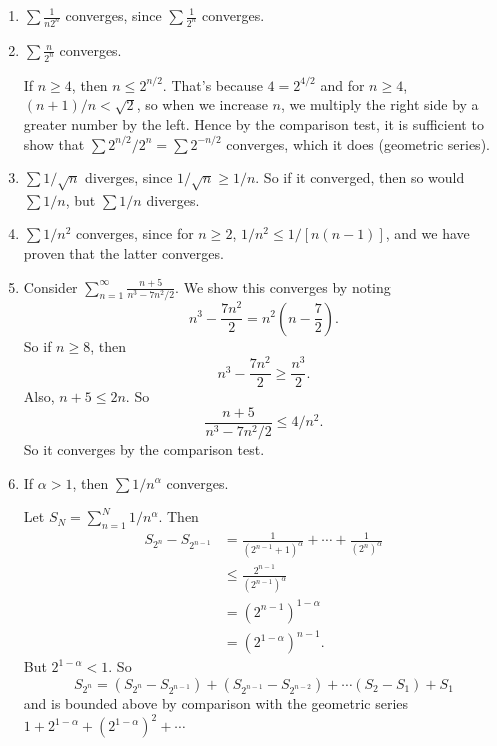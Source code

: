 \documentclass[a4paper]{article}
\begin{document}
\begin{eg}\leavevmode
  \begin{enumerate}
    \item $\sum \frac{1}{n2^n}$ converges, since $\sum \frac{1}{2^n}$ converges.
    \item $\sum \frac{n}{2^n}$ converges.

      If $n \geq 4$, then $n \leq 2^{n/2}$. That's because $4 = 2^{4/2}$ and for $n\geq 4$, $(n + 1)/n < \sqrt{2}$, so when we increase $n$, we multiply the right side by a greater number by the left. Hence by the comparison test, it is sufficient to show that $\sum 2^{n/2}/2^n = \sum 2^{-n/2}$ converges, which it does (geometric series).
    \item $\sum 1/\sqrt{n}$ diverges, since $1/\sqrt{n} \geq 1/n$. So if it converged, then so would $\sum 1/n$, but $\sum 1/n$ diverges.
    \item $\sum 1/n^2$ converges, since for $n \geq 2$, $1/n^2 \leq 1/[n(n - 1)]$, and we have proven that the latter converges.
    \item Consider $\displaystyle \sum_{n = 1}^\infty \frac{n + 5}{n^3 - 7n^2/2}$. We show this converges by noting
      \[
        n^3 - \frac{7n^2}{2} = n^2\left(n - \frac{7}{2}\right).
      \]
      So if $n \geq 8$, then
      \[
        n^3 - \frac{7n^2}{2} \geq \frac{n^3}{2}.
      \]
      Also, $n + 5 \leq 2n$. So
      \[
        \frac{n + 5}{n^3 - 7n^2/2} \leq 4/n^2.
      \]
      So it converges by the comparison test.
    \item If $\alpha > 1$, then $\sum 1/n^\alpha$ converges.

      Let $S_N = \sum_{n = 1}^N 1/n^\alpha$. Then
      \begin{align*}
        S_{2^n} - S_{2^{n - 1}} &= \frac{1}{(2^{n - 1} + 1)^\alpha} + \cdots + \frac{1}{(2^{n})^\alpha}\\
        &\leq \frac{2^{n - 1}}{(2^{n - 1})^\alpha}\\
        &= (2^{n - 1})^{1 - \alpha}\\
        &= (2^{1 - \alpha})^{n - 1}.
      \end{align*}
      But $2^{1 - \alpha} < 1$. So
      \[
        S_{2^n} = (S_{2^n} - S_{2^{n - 1}}) + (S_{2^{n - 1}} - S_{2^{n -2 }}) + \cdots (S_2 - S_1) + S_1
      \]
      and is bounded above by comparison with the geometric series $1 + 2^{1 - \alpha} + (2^{1 - \alpha})^2 + \cdots$
  \end{enumerate}
\end{eg}
\end{document}
